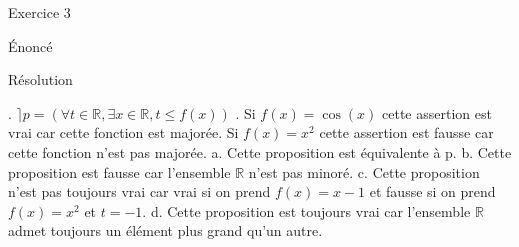 \hypertarget{Exercice_3}{
\Huge{\begin{center}Exercice 3\end{center} \leavevmode\newline }}

\hypertarget{enonce}{%
\LARGE{Énoncé}\label{enonce}}
\newline
\newline


\hypertarget{resolution}{%
\LARGE{Résolution}\label{resolution}}
\newline
{}. $\rceil p = (\forall t\in \mathbb{R}, \exists x \in \mathbb{R}, t \leq f(x))$
\newline
{}. Si $f(x) = \cos (x)$ cette assertion est vrai car cette fonction est majorée.
\newline
Si $f(x) = x^2$ cette assertion est fausse car cette fonction n'est pas majorée.
\newline
{}
\newline
\newline
a. Cette proposition est équivalente à p.
\newline
\newline
b. Cette proposition est fausse car l'ensemble $\mathbb{R}$ n'est pas minoré.
\newline
\newline
c. Cette proposition n'est pas toujours vrai car vrai si on prend $f(x) = x-1$ et fausse si on prend $f(x) = x^2$ et $t=-1$.
\newline
\newline
d. Cette proposition est toujours vrai car l'ensemble $\mathbb{R}$ admet toujours un élément plus grand qu'un autre.
